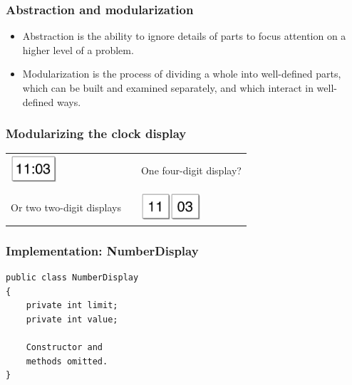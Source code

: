 \begin{frame}
\frametitle{Abstraction and modularization}
\begin{itemize}
\item \alert{Abstraction} is the ability to ignore details of parts to focus attention on a higher level of a problem. 
\item \alert{Modularization} is the process of dividing a whole into well-defined parts, which can be built and examined separately, and which interact in well-defined ways. 
\end{itemize}
\end{frame}

\begin{frame}
\frametitle{Modularizing the clock display}
\begin{tabular}{lll}
\begin{minipage}{3cm}
\includegraphics[height=1cm,keepaspectratio]{./figures/cl1} \end{minipage} & \mbox{}\hspace{1cm} & One four-digit display?\\
\mbox{}\\
\begin{minipage}{3cm}
Or two two-digit displays
\end{minipage}& & \begin{minipage}{3cm}\includegraphics[height=1cm,keepaspectratio]{./figures/cl2}\includegraphics[height=1cm,keepaspectratio]{./figures/cl3}\end{minipage}
\end{tabular}
\end{frame}


\begin{frame}[fragile]
\frametitle{Implementation: NumberDisplay}
\codelist
\begin{lstlisting}[linewidth=6cm]
public class NumberDisplay
{
    private int limit;
    private int value;

    Constructor and
    methods omitted.
}
\end{lstlisting}
\end{frame}

